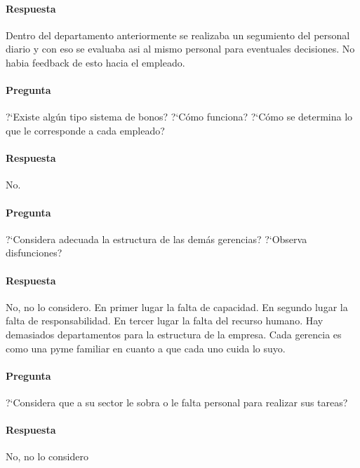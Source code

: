 \documentclass[12pt,a4paper,spanish]{article}
\begin{document}
	\paragraph{Respuesta}
Dentro del departamento anteriormente se realizaba un segumiento del personal diario y con eso se evaluaba asi al mismo personal para eventuales decisiones.
No habia feedback de esto hacia el empleado.

	\paragraph{Pregunta}
	 ?`Existe alg\'un tipo sistema de bonos?  ?`C\'omo funciona?  ?`C\'omo se determina lo que le corresponde a cada empleado?
	\paragraph{Respuesta}
No.
	\paragraph{Pregunta}
	 ?`Considera adecuada la estructura de las dem\'as gerencias?  ?`Observa disfunciones?
	\paragraph{Respuesta}
No, no lo considero.
En primer lugar la falta de capacidad.
En segundo lugar la falta de responsabilidad.
En tercer lugar la falta del recurso humano.
Hay demasiados departamentos para la estructura de la empresa.
Cada gerencia es como una pyme familiar en cuanto a que cada uno cuida lo suyo.

	\paragraph{Pregunta}
	 ?`Considera que a su sector le sobra o le falta personal para realizar sus tareas?
	\paragraph{Respuesta}
	No, no lo considero
\end{document}
